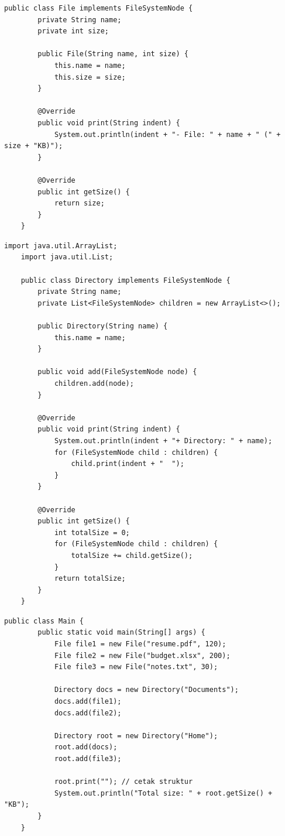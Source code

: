 \begin{lstlisting}[style=JavaStyle, caption={Leaf: File}, label={lst:composite-leaf}]
	public class File implements FileSystemNode {
		private String name;
		private int size;
		
		public File(String name, int size) {
			this.name = name;
			this.size = size;
		}
		
		@Override
		public void print(String indent) {
			System.out.println(indent + "- File: " + name + " (" + size + "KB)");
		}
		
		@Override
		public int getSize() {
			return size;
		}
	}
\end{lstlisting}

\begin{lstlisting}[style=JavaStyle, caption={Composite: Directory}, label={lst:composite-composite}]
	import java.util.ArrayList;
	import java.util.List;
	
	public class Directory implements FileSystemNode {
		private String name;
		private List<FileSystemNode> children = new ArrayList<>();
		
		public Directory(String name) {
			this.name = name;
		}
		
		public void add(FileSystemNode node) {
			children.add(node);
		}
		
		@Override
		public void print(String indent) {
			System.out.println(indent + "+ Directory: " + name);
			for (FileSystemNode child : children) {
				child.print(indent + "  ");
			}
		}
		
		@Override
		public int getSize() {
			int totalSize = 0;
			for (FileSystemNode child : children) {
				totalSize += child.getSize();
			}
			return totalSize;
		}
	}
\end{lstlisting}

\begin{lstlisting}[style=JavaStyle, caption={Client: Struktur File}, label={lst:composite-main}]
	public class Main {
		public static void main(String[] args) {
			File file1 = new File("resume.pdf", 120);
			File file2 = new File("budget.xlsx", 200);
			File file3 = new File("notes.txt", 30);
			
			Directory docs = new Directory("Documents");
			docs.add(file1);
			docs.add(file2);
			
			Directory root = new Directory("Home");
			root.add(docs);
			root.add(file3);
			
			root.print(""); // cetak struktur
			System.out.println("Total size: " + root.getSize() + "KB");
		}
	}
\end{lstlisting}

